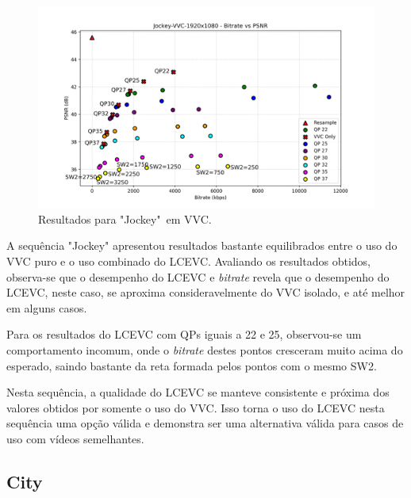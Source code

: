\begin{figure}[h]
    \centering
    \includegraphics[width=1.0\textwidth]{img/Jockey-VVC.png}
    \caption{Resultados para "Jockey"\ em \acrshort{VVC}. \cite{uvg_dataset}}
    \label{fig:Jockey-VVC}
\end{figure}

A sequência "Jockey" apresentou resultados bastante equilibrados entre o uso do 
\acrshort{VVC} puro e o uso combinado do \acrshort{LCEVC}. Avaliando os  resultados
obtidos, observa-se que o desempenho do \acrshort{LCEVC} e \textit{bitrate} revela
que o desempenho do \acrshort{LCEVC}, neste caso, se aproxima consideravelmente do
\acrshort{VVC} isolado, e até melhor em alguns casos.

Para os resultados do \acrshort{LCEVC} com QPs iguais a 22 e 25, observou-se um 
comportamento incomum, onde o \textit{bitrate} destes pontos cresceram muito 
acima do esperado, saindo bastante da reta formada pelos pontos com o mesmo SW2.

Nesta sequência, a qualidade do \acrshort{LCEVC} se manteve consistente e próxima
dos valores obtidos por somente o uso do \acrshort{VVC}. Isso torna o uso do 
\acrshort{LCEVC} nesta sequência uma opção válida e demonstra ser uma alternativa
válida para casos de uso com vídeos semelhantes.

\newpage
\subsection{City}

